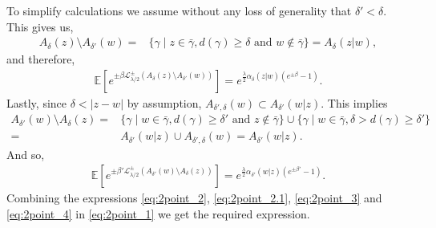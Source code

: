 \documentclass[a4paper, 11pt, reqno]{amsart}
\theoremstyle{definition} \newtheorem{defn}{Definition}[section]
\theoremstyle{remark} \newtheorem{rem}[defn]{Remark}
\theoremstyle{remark} \newtheorem*{rem*}{Remark}
\theoremstyle{plain} \newtheorem{thm}[defn]{Theorem}
\theoremstyle{plain} \newtheorem{lem}[defn]{Lemma}
\theoremstyle{plain} \newtheorem{prop}[defn]{Proposition}
\theoremstyle{plain} \newtheorem{cor}[defn]{Corollary}
\theoremstyle{remark} \newtheorem{exm}[defn]{\textbf{Example}}
\theoremstyle{remark} \newtheorem{exms}[defn]{\textbf{Examples}}
\theoremstyle{remark} \newtheorem*{bl}{}
\numberwithin{equation}{section} %
\newcommand{\mc}{\mathcal}
\newcommand{\E}{\mathbb{E}}
\newcommand{\Poi}{\operatorname{Poi}}
\begin{document}
        To simplify calculations we assume without any loss of generality that $\delta' < \delta$. This gives us, 
		\begin{align}
			A_{\delta}(z)\setminus A_{\delta'} (w) 
			= & \{ \gamma  \mid z \in \bar{\gamma}, d(\gamma)\ge \delta \text{ and } w \notin \bar{\gamma}\}	
	       	=A_{\delta}(z|w), 
		\end{align}
		and therefore,
		\begin{align}\label{eq:2point_3}
			\E \left[e^{ \pm\beta \mc{L}_{\lambda/2}^{\pm}( A_{\delta}(z)\setminus A_{\delta'} (w) )}\right] = e^{\frac{\lambda}{2} \alpha_{\delta}(z|w)(e^{\pm \beta} -1)}.
		\end{align}
		Lastly, since $\delta < |z-w|$ by assumption, $A_{\delta', \delta} (w) \subset A_{\delta'}(w|z)$. This implies
		\begin{align}
			A_{\delta'} (w)\setminus A_{\delta}(z) 
			= & \{ \gamma  \mid w \in \bar{\gamma}, d(\gamma)\ge \delta' \text{ and } z \notin \bar{\gamma}\}\cup \{ \gamma \mid w \in \bar{\gamma}, \delta>d(\gamma)\ge \delta' \}
			\nonumber \\
			= & A_{\delta'}(w|z) \cup A_{\delta', \delta}(w) = A_{\delta'}(w|z).
		\end{align}
		And so,
		\begin{align}\label{eq:2point_4}
			\E \left[e^ {\pm\beta' \mc{L}_{\lambda/2}^{\pm}(A_{\delta'} (w)\setminus A_{\delta}(z))} \right] = e^{\frac{\lambda}{2} \alpha_{\delta'}(w|z)(e^{\pm \beta'} -1)}.
		\end{align}		
		Combining the expressions \eqref{eq:2point_2}, \eqref{eq:2point_2.1}, \eqref{eq:2point_3} and \eqref{eq:2point_4} in \eqref{eq:2point_1} we get
		the required expression.
\end{document}
